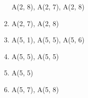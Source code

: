 \documentclass[11pt, fleqn]{article}
\begin{document}
\begin{enumerate}
\begin{minipage}[t]{13cm}
														  A(2, 8), {\color{blue} A(2, 7), A(2, 8)}
														 \end{minipage} 
	\item {} \begin{minipage}[t]{13cm}
														  A(2, 7), A(2, 8)
														 \end{minipage} 
	\item {}  \begin{minipage}[t]{13cm}
														  A(5, 1), A(5, 5), A(5, 6)
														 \end{minipage} 
	\item {} \begin{minipage}[t]{13cm}
														  A(5, 5), {\color{blue} A(5, 5)}
														 \end{minipage} 
	\item {} \begin{minipage}[t]{13cm}
														  A(5, 5)
														 \end{minipage} 
	\item {} \begin{minipage}[t]{13cm}
														  A(5, 7), A(5, 8)
														 \end{minipage}
													 
\end{enumerate}
\end{document}
